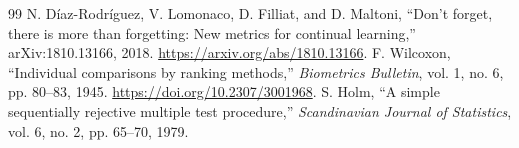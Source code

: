\documentclass[10pt,a4paper]{article}
\begin{document}
\begin{thebibliography}{99}
 N. D\'iaz-Rodr\'iguez, V. Lomonaco, D. Filliat, and D. Maltoni, ``Don't forget, there is more than forgetting: New metrics for continual learning,'' arXiv:1810.13166, 2018. \url{https://arxiv.org/abs/1810.13166}.
 F. Wilcoxon, ``Individual comparisons by ranking methods,'' \emph{Biometrics Bulletin}, vol. 1, no. 6, pp. 80--83, 1945. \url{https://doi.org/10.2307/3001968}.
 S. Holm, ``A simple sequentially rejective multiple test procedure,'' \emph{Scandinavian Journal of Statistics}, vol. 6, no. 2, pp. 65--70, 1979.
\end{thebibliography}
\end{document}
